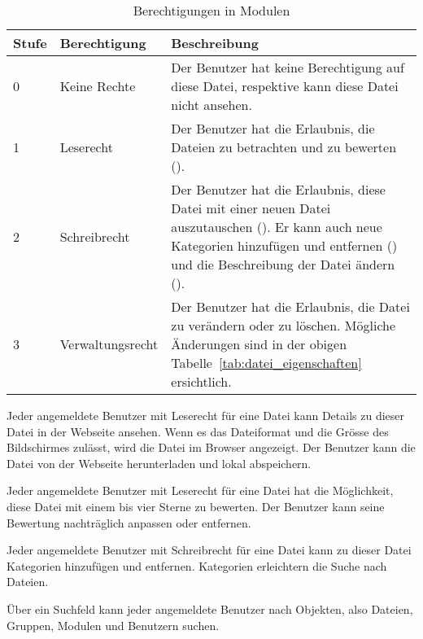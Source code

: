 \begin{table}[H]
\begin{tabularx}{\textwidth}{|l|l|X|} \hline
\textbf{Stufe} & \textbf{Berechtigung}     & \textbf{Beschreibung} \\ \hline
0     & Keine Rechte     & Der Benutzer hat keine Berechtigung auf diese Datei, respektive kann diese Datei nicht ansehen.\\ \hline
1     & Leserecht        & Der Benutzer hat die Erlaubnis, die Dateien zu betrachten und zu bewerten ({Datei bewerten}).\\ \hline
2     & Schreibrecht     & Der Benutzer hat die Erlaubnis, diese Datei mit einer neuen Datei auszutauschen ({Datei hochladen}). Er kann auch neue Kategorien hinzufügen und entfernen ({Datei kategorisieren}) und die Beschreibung der Datei ändern ({Datei bearbeiten}).\\ \hline
3     & Verwaltungsrecht & Der Benutzer hat die Erlaubnis, die Datei zu verändern oder zu löschen. Mögliche Änderungen sind in der obigen Tabelle~\ref{tab:datei_eigenschaften} ersichtlich.\\ \hline
\end{tabularx}
\caption{Berechtigungen in Modulen}
\label{tab:datei_rechte}
\end{table}

Jeder angemeldete Benutzer mit Leserecht für eine Datei kann Details zu dieser Datei in der Webseite ansehen. Wenn es das Dateiformat und die Grösse des Bildschirmes zulässt, wird die Datei im Browser angezeigt. Der Benutzer kann die Datei von der Webseite herunterladen und lokal abspeichern.

Jeder angemeldete Benutzer mit Leserecht für eine Datei hat die Möglichkeit, diese Datei mit einem bis vier Sterne  zu bewerten. Der Benutzer kann seine Bewertung nachträglich anpassen oder entfernen.

Jeder angemeldete Benutzer mit Schreibrecht für eine Datei kann zu dieser Datei Kategorien hinzufügen und entfernen. Kategorien erleichtern die Suche nach Dateien.

Über ein Suchfeld kann jeder angemeldete Benutzer nach Objekten, also Dateien, Gruppen, Modulen und Benutzern suchen.\\

